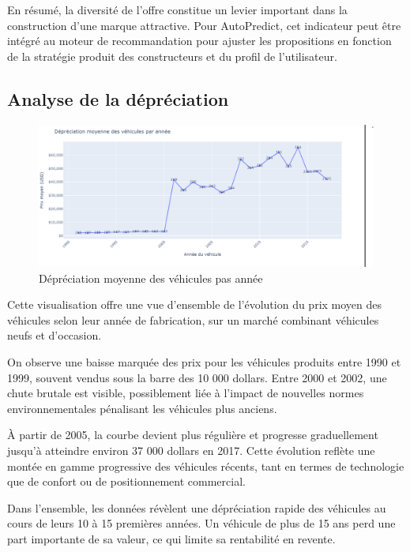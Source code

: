 \documentclass[12pt]{report}
\begin{document}
En résumé, la diversité de l’offre constitue un levier important dans la construction d’une marque attractive. Pour AutoPredict, cet indicateur peut être intégré au moteur de recommandation pour ajuster les propositions en fonction de la stratégie produit des constructeurs et du profil de l’utilisateur.


\subsection{Analyse de la dépréciation}

\begin{figure}[H]
    \centering
    \includegraphics[width=1\textwidth]{Annee_prix.png}
    \caption{Dépréciation moyenne des véhicules pas année}
    \label{fig:annee-prix}
\end{figure}

Cette visualisation offre une vue d’ensemble de l’évolution du prix moyen des véhicules selon leur année de fabrication, sur un marché combinant véhicules neufs et d’occasion.

On observe une baisse marquée des prix pour les véhicules produits entre 1990 et 1999, souvent vendus sous la barre des 10 000 dollars. Entre 2000 et 2002, une chute brutale est visible, possiblement liée à l’impact de nouvelles normes environnementales pénalisant les véhicules plus anciens.

À partir de 2005, la courbe devient plus régulière et progresse graduellement jusqu’à atteindre environ 37 000 dollars en 2017. Cette évolution reflète une montée en gamme progressive des véhicules récents, tant en termes de technologie que de confort ou de positionnement commercial.

Dans l’ensemble, les données révèlent une dépréciation rapide des véhicules au cours de leurs 10 à 15 premières années. Un véhicule de plus de 15 ans perd une part importante de sa valeur, ce qui limite sa rentabilité en revente.
\end{document}
